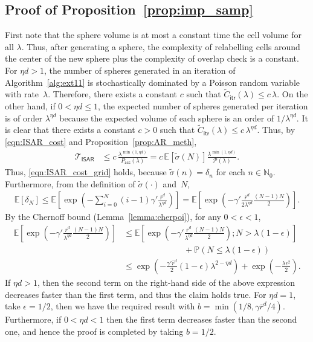 \documentclass[11pt]{article}
\newcommand{\pp}{\mathbb{P}}
\newcommand{\ee}{\mathbb{E}}
\newcommand{\rbdd}{\overline{r}}
\newcommand{\mbb}{\mathbb}
\newcommand{\lt}{\left}
\newcommand{\rt}{\right}
\newcommand{\wt}{\widetilde}
\newcommand{\pno}{\mathcal{P}(\lambda)}
\begin{document}
\begin{appendices}
\subsection{Proof of Proposition~\ref{prop:imp_samp}}
\label{sec:proof_imp_samp}
First note that the sphere volume is at most a constant time the cell volume for all $\lambda$. Thus, after generating a sphere, the complexity of relabelling cells around the center of the new sphere plus the complexity of overlap check is a constant. For $\eta d > 1$, {the number of} spheres generated in {an iteration} of
Algorithm~\ref{alg:ext11} is stochastically dominated by a Poisson random variable with rate~$\lambda$. 
Therefore, there exists a constant $c$ such that $\wt C_{\mathsf{itr}}(\lambda) \leq c\, \lambda$.
On the other hand, if $0 < \eta d \leq 1$, the expected number of spheres generated per iteration is of order $\lambda^{\eta d}$ because the expected volume
of each sphere is an order of $1/\lambda^{\eta d}$. It is clear that there exists a constant $c > 0 $ such that
$\wt C_{\mathsf{itr}}(\lambda) \leq c\, \lambda^{\eta d } $.
Thus, by \eqref{eqn:ISAR_cost} and Proposition~\ref{prop:AR_meth},
\begin{align*}
 \mathcal{T}_{\mathsf{ISAR}} &\leq c \,  \frac{\lambda^{\min(1, \eta d)}}{P_{\mathsf{acc}} (\lambda)} = c\, \ee[\wt \sigma(N)] \frac{\lambda^{\min(1, \eta d)}}{\pno}.
\end{align*}
Thus, \eqref{eqn:ISAR_cost_grid} holds, because $\wt \sigma(n) = \delta_n$ for each $n \in \mbb{N}_0$. Furthermore, from the definition of $\wt \sigma(\cdot)$ and~$N$,
 \begin{align*}
  \ee\lt[\delta_N\rt] \leq  \ee\lt[ \exp\lt(- \sum_{i=0}^{N}(i-1) \gamma' \frac{\rbdd^d}{\lambda^{\eta d}} \rt) \rt] = \ee\lt[ \exp\lt(- \gamma' \frac{\rbdd^d}{2\lambda^{\eta d}}  \frac{(N-1)N}{2} \rt) \rt].
 \end{align*}
{By the Chernoff bound} (Lemma~\ref{lemma:cherpoi}), for any $0 < \epsilon < 1$,
\begin{align*}
 \ee\lt[ \exp\lt(- \gamma' \frac{\rbdd^d}{\lambda^{\eta d}} \frac{(N-1)N}{2} \rt) \rt] &\leq  \ee\lt[ \exp\lt(- \gamma' \frac{\rbdd^d}{\lambda^{\eta d}} \frac{(N-1)N}{2} \rt); N > \lambda\lt(1 - \epsilon\rt) \rt]\\
                                                       &\hspace{3cm} + \pp\lt( N \leq \lambda\lt(1 - \epsilon\rt)\rt)\\
                                                       &\leq  \exp\lt(- \frac{\gamma' \rbdd^d}{2}  \lt(1 - \epsilon \rt) \lambda^{2 - \eta d}\rt) + \exp\lt( -\frac{\lambda \epsilon^2}{2}\rt).
\end{align*}
If $\eta d > 1$, then the second term on the right-hand side of the above expression decreases faster than the first term, and thus the claim holds true.
For $\eta d = 1$, take $\epsilon = 1/2$, then we have the required result with $b = \min\lt(1/8, \gamma \rbdd^d/4\rt)$.
Furthermore, if $0 < \eta d < 1$ then the first term decreases faster than the second one, and  hence the proof is completed by taking $b = 1/2$.






\end{appendices}
\end{document}
